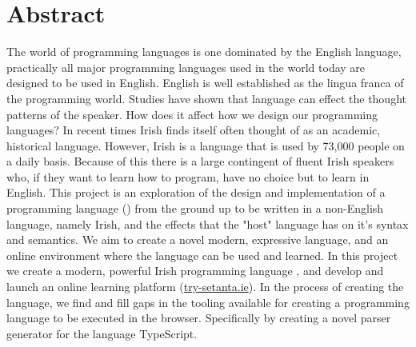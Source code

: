 \chapter{Abstract}
The world of programming languages is one dominated by the English language, practically all major programming languages used in the world today are designed to be used in English. English is well established as the lingua franca of the programming world.
Studies have shown that language can effect the thought patterns of the speaker\cite{languagecolour}. How does it affect how we design our programming languages?
In recent times Irish finds itself often thought of as an academic, historical language. However, Irish is a language that is used by 73,000 people on a daily basis\cite{csoirish}. Because of this there is a large contingent of fluent Irish speakers who, if they want to learn how to program, have no choice but to learn in English.
This project is an exploration of the design and implementation of a programming language (\Setanta{}) from the ground up to be written in a non-English language, namely Irish, and the effects that the "host" language has on it's syntax and semantics. We aim to create a novel modern, expressive language, and an online environment where the language can be used and learned.
In this project we create a modern, powerful Irish programming language \Setanta{}, and develop and launch an online learning platform (\href{https://try-setanta.ie}{try-setanta.ie}). In the process of creating the language, we find and fill gaps in the tooling available for creating a programming language to be executed in the browser. Specifically by creating a novel parser generator \tsPEG{} for the language TypeScript.
